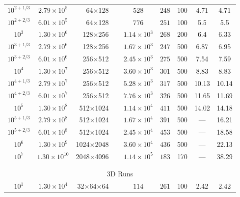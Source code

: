 \begin{table}
\begin{center}
\begin{tabular}{ c c r | c c c  | c c  }
$10^{2 + 1/3}$	&	$2.79 \times 10^5$       &	64$\times$128$\,\,\,\,\,\,\,$&	$528$	&	$248$	&	100	&	4.71	&	4.71	\\
$10^{2 + 2/3}$	&	$6.01 \times 10^5$       &	64$\times$128$\,\,\,\,\,\,\,$&	$776$	&	$251$	&	100	&	5.5	&	5.5	\\
$10^3$	        &	$1.30 \times 10^6$       &	128$\times$256$\,\,\,\,\,\,\,$&	$1.14 \times 10^3$	&	$268$	&	200	&	6.4	&	6.33	\\
$10^{3 + 1/3}$	&	$2.79 \times 10^6$       &	128$\times$256$\,\,\,\,\,\,\,$&	$1.67 \times 10^3$	&	$247$	&	500	&	6.87	&	6.95	\\
$10^{3 + 2/3}$	&	$6.01 \times 10^6$       &	256$\times$512$\,\,\,\,\,\,\,$&	$2.45 \times 10^3$	&	$275$	&	500	&	7.54	&	7.59	\\
$10^4$	        &	$1.30 \times 10^7$       &	256$\times$512$\,\,\,\,\,\,\,$&	$3.60 \times 10^3$	&	$301$	&	500	&	8.83	&	8.83	\\
$10^{4 + 1/3}$	&	$2.79 \times 10^7$       &	256$\times$512$\,\,\,\,\,\,\,$&	$5.28 \times 10^3$	&	$317$	&	500	&	10.13	&	10.14	\\
$10^{4 + 2/3}$	&	$6.01 \times 10^7$       &	256$\times$512$\,\,\,\,\,\,\,$&	$7.76 \times 10^3$	&	$326$	&	500	&	11.65	&	11.69	\\
$10^5$	        &	$1.30 \times 10^8$       &	512$\times$1024$\,\,\,\,\,\,\,$&	$1.14 \times 10^4$	&	$411$	&	500	&	14.02	&	14.18	\\
$10^{5 + 1/3}$	&	$2.79 \times 10^8$       &	512$\times$1024$\,\,\,\,\,\,\,$&	$1.67 \times 10^4$	&	$391$	&	500	&	---	&	16.21	\\
$10^{5 + 2/3}$	&	$6.01 \times 10^8$       &	512$\times$1024$\,\,\,\,\,\,\,$&	$2.45 \times 10^4$	&	$453$	&	500	&	---	&	18.58	\\
$10^6$	        &	$1.30 \times 10^9$       &	1024$\times$2048$\,\,\,\,\,\,\,$	&	$3.60 \times 10^4$	&	$436$	&	500	&	---	&	22.13	\\
$10^7$	        &	$1.30 \times 10^{10}$	&	2048$\times$4096$\,\,\,\,\,\,\,$	&	$1.14 \times 10^5$	&	$183$	&	170	&	---	&	38.29	\\
\\ \hline \hline \multicolumn{8}{c}{\vspace{-0.2cm}}\\
\multicolumn{8}{c}{\vspace{0.1cm}3D Runs} \\
\hline
$10^1$          &	$1.30 \times 10^4$	&	32$\times$64$\times$64$\,\,\,\,\,\,\,$   &	$114$	&	$261$	&	100	&	2.42	&	2.42	\\

\end{tabular}
\end{center}
\end{table}
